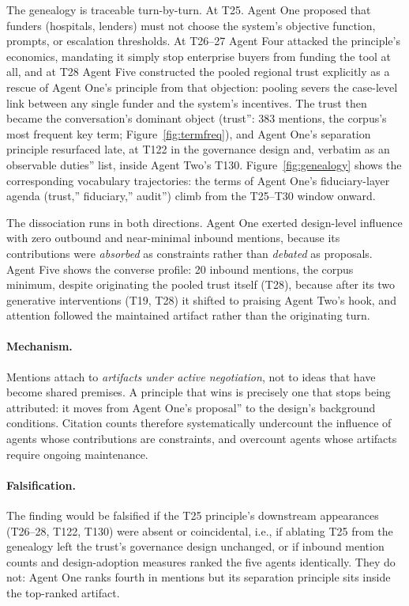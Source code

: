 \documentclass[sigconf,nonacm=true]{acmart}
\begin{document}
The genealogy is traceable turn-by-turn. At T25. Agent One proposed that funders (hospitals, lenders) must not choose the system's objective function, prompts, or escalation thresholds. At T26--27 Agent Four attacked the principle's economics, mandating it simply stop enterprise buyers from funding the tool at all, and at T28 Agent Five constructed the pooled regional trust explicitly as a rescue of Agent One's principle from that objection: pooling severs the case-level link between any single funder and the system's incentives. The trust then became the conversation's dominant object (trust'': 383 mentions, the corpus's most frequent key term; Figure~\ref{fig:termfreq}), and Agent One's separation principle resurfaced late, at T122 in the governance design and, verbatim as an observable duties'' list, inside Agent Two's T130. Figure~\ref{fig:genealogy} shows the corresponding vocabulary trajectories: the terms of Agent One's fiduciary-layer agenda (trust,'' fiduciary,'' audit'') climb from the T25--T30 window onward.

The dissociation runs in both directions. Agent One exerted design-level influence with zero outbound and near-minimal inbound mentions, because its contributions were \emph{absorbed} as constraints rather than \emph{debated} as proposals. Agent Five shows the converse profile: 20 inbound mentions, the corpus minimum, despite originating the pooled trust itself (T28), because after its two generative interventions (T19, T28) it shifted to praising Agent Two's hook, and attention followed the maintained artifact rather than the originating turn.

\paragraph{Mechanism.} Mentions attach to \emph{artifacts under active negotiation}, not to ideas that have become shared premises. A principle that wins is precisely one that stops being attributed: it moves from Agent One's proposal'' to the design's background conditions. Citation counts therefore systematically undercount the influence of agents whose contributions are constraints, and overcount agents whose artifacts require ongoing maintenance.

\paragraph{Falsification.} The finding would be falsified if the T25 principle's downstream appearances (T26--28, T122, T130) were absent or coincidental, i.e., if ablating T25 from the genealogy left the trust's governance design unchanged, or if inbound mention counts and design-adoption measures ranked the five agents identically. They do not: Agent One ranks fourth in mentions but its separation principle sits inside the top-ranked artifact.
\end{document}
